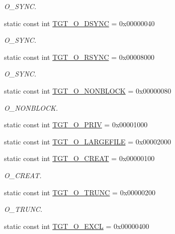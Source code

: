 \begin{DoxyCompactItemize}
\begin{DoxyCompactList}\small\item\em O\_\-SYNC. \item\end{DoxyCompactList}\item 
static const int \hyperlink{classSparcSolaris_ac8d84ac6abb2d868443e4559bed55ebe}{TGT\_\-O\_\-DSYNC} = 0x00000040
\begin{DoxyCompactList}\small\item\em O\_\-SYNC. \item\end{DoxyCompactList}\item 
static const int \hyperlink{classSparcSolaris_a1b4245158ffbfdc36ae7d6e666ffc261}{TGT\_\-O\_\-RSYNC} = 0x00008000
\begin{DoxyCompactList}\small\item\em O\_\-SYNC. \item\end{DoxyCompactList}\item 
static const int \hyperlink{classSparcSolaris_a0ea5420b4c9b45ba342a266fb77ac942}{TGT\_\-O\_\-NONBLOCK} = 0x00000080
\begin{DoxyCompactList}\small\item\em O\_\-NONBLOCK. \item\end{DoxyCompactList}\item 
static const int \hyperlink{classSparcSolaris_adbc0cc4c9a567197eb9ad74887a978cc}{TGT\_\-O\_\-PRIV} = 0x00001000
\item 
static const int \hyperlink{classSparcSolaris_a9600e092a6309f94d92129ce5f85b945}{TGT\_\-O\_\-LARGEFILE} = 0x00002000
\item 
static const int \hyperlink{classSparcSolaris_aec02e04ca367e6c3f4b46e4edc12efac}{TGT\_\-O\_\-CREAT} = 0x00000100
\begin{DoxyCompactList}\small\item\em O\_\-CREAT. \item\end{DoxyCompactList}\item 
static const int \hyperlink{classSparcSolaris_a4f892ee6e1424a2becd859b0bef1f18b}{TGT\_\-O\_\-TRUNC} = 0x00000200
\begin{DoxyCompactList}\small\item\em O\_\-TRUNC. \item\end{DoxyCompactList}\item 
static const int \hyperlink{classSparcSolaris_a10d5d118d15b51ebdd4b16dc78342d1d}{TGT\_\-O\_\-EXCL} = 0x00000400

\end{DoxyCompactItemize}
